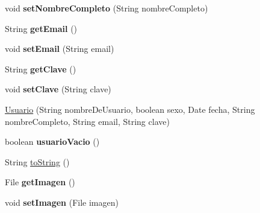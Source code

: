 \begin{DoxyCompactItemize}
\item 
\hypertarget{classcom_1_1ucab_1_1javachat_1_1_cliente_1_1model_1_1_usuario_a558506188faab7a0293a175d40c5ce36}{void {\bfseries set\-Nombre\-Completo} (String nombre\-Completo)}\label{classcom_1_1ucab_1_1javachat_1_1_cliente_1_1model_1_1_usuario_a558506188faab7a0293a175d40c5ce36}

\item 
\hypertarget{classcom_1_1ucab_1_1javachat_1_1_cliente_1_1model_1_1_usuario_ae2d27467fe4bc3dfe209dfec91394c91}{String {\bfseries get\-Email} ()}\label{classcom_1_1ucab_1_1javachat_1_1_cliente_1_1model_1_1_usuario_ae2d27467fe4bc3dfe209dfec91394c91}

\item 
\hypertarget{classcom_1_1ucab_1_1javachat_1_1_cliente_1_1model_1_1_usuario_ab774a1a3508f87722db5aadceb062ad9}{void {\bfseries set\-Email} (String email)}\label{classcom_1_1ucab_1_1javachat_1_1_cliente_1_1model_1_1_usuario_ab774a1a3508f87722db5aadceb062ad9}

\item 
\hypertarget{classcom_1_1ucab_1_1javachat_1_1_cliente_1_1model_1_1_usuario_ada00fd6555bb06d0bb5a726a5ebc1259}{String {\bfseries get\-Clave} ()}\label{classcom_1_1ucab_1_1javachat_1_1_cliente_1_1model_1_1_usuario_ada00fd6555bb06d0bb5a726a5ebc1259}

\item 
\hypertarget{classcom_1_1ucab_1_1javachat_1_1_cliente_1_1model_1_1_usuario_a0cdcb1ff20e55964e5af4177dadd89a8}{void {\bfseries set\-Clave} (String clave)}\label{classcom_1_1ucab_1_1javachat_1_1_cliente_1_1model_1_1_usuario_a0cdcb1ff20e55964e5af4177dadd89a8}

\item 
\hyperlink{classcom_1_1ucab_1_1javachat_1_1_cliente_1_1model_1_1_usuario_af5dfba7bb9e4c89c8627cd630e80493d}{Usuario} (String nombre\-De\-Usuario, boolean sexo, Date fecha, String nombre\-Completo, String email, String clave)
\item 
\hypertarget{classcom_1_1ucab_1_1javachat_1_1_cliente_1_1model_1_1_usuario_a451d92b5925acf1f2f890e4986c5f96a}{boolean {\bfseries usuario\-Vacio} ()}\label{classcom_1_1ucab_1_1javachat_1_1_cliente_1_1model_1_1_usuario_a451d92b5925acf1f2f890e4986c5f96a}

\item 
String \hyperlink{classcom_1_1ucab_1_1javachat_1_1_cliente_1_1model_1_1_usuario_aa7602a327f0e4c69c61b8e650789ff97}{to\-String} ()
\item 
\hypertarget{classcom_1_1ucab_1_1javachat_1_1_cliente_1_1model_1_1_usuario_a6076d2bdaaa7f2b04b03fc18ff0bc114}{File {\bfseries get\-Imagen} ()}\label{classcom_1_1ucab_1_1javachat_1_1_cliente_1_1model_1_1_usuario_a6076d2bdaaa7f2b04b03fc18ff0bc114}

\item 
\hypertarget{classcom_1_1ucab_1_1javachat_1_1_cliente_1_1model_1_1_usuario_a5c739c484c0d22ea8255818d200785fd}{void {\bfseries set\-Imagen} (File imagen)}\label{classcom_1_1ucab_1_1javachat_1_1_cliente_1_1model_1_1_usuario_a5c739c484c0d22ea8255818d200785fd}

\end{DoxyCompactItemize}


